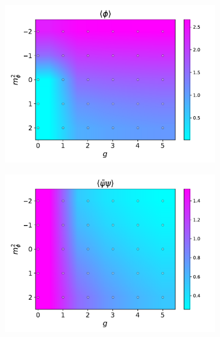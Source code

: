 \begin{figure}[htp]
    \centering
    \begin{subfigure}[b]{0.48\textwidth}
        \includegraphics[width=\textwidth]{figures/phase_diagram/m_g_phi.pdf}
    \end{subfigure}
    \begin{subfigure}[b]{0.48\textwidth}
        \includegraphics[width=\textwidth]{figures/phase_diagram/m_g_cond.pdf}
    \end{subfigure}
    \begin{subfigure}[b]{0.48\textwidth}

\end{subfigure}
\end{figure}
